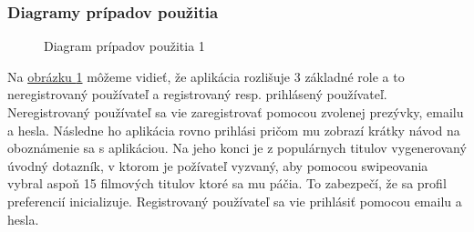 \subsubsection{Diagramy prípadov použitia}
\begin{figure}[hbt!]
  \centering  
  \def\stackalignment{c}
           {\scriptsize}
	\caption{Diagram prípadov použitia 1}
	\label{usecase1}
\end{figure}

Na \hyperref[usecase1]{obrázku \ref{usecase1}} môžeme vidieť, že aplikácia rozlišuje 3 základné role a to neregistrovaný používateľ a registrovaný resp. prihlásený používateľ. Neregistrovaný používateľ sa vie zaregistrovať pomocou zvolenej prezývky, emailu a hesla. Následne ho aplikácia rovno prihlási pričom mu zobrazí krátky návod na oboznámenie sa s aplikáciou. Na jeho konci je z populárnych titulov vygenerovaný úvodný dotazník, v ktorom je požívateľ vyzvaný, aby pomocou swipeovania vybral aspoň 15 filmových titulov ktoré sa mu páčia. To zabezpečí, že sa profil preferencií inicializuje. Registrovaný používateľ sa vie prihlásiť pomocou emailu a hesla.
\pagebreak

